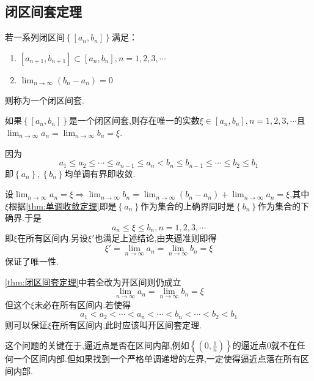 \subsection{闭区间套定理}
\begin{formal}
    \begin{definition}[闭区间套的定义]\label{def:闭区间套的定义}
        若一系列闭区间$\displaystyle\left\{\left[a_n,b_n\right]\right\}$满足：\begin{enumerate}[label={\textup{(\arabic*)}}]
            \item $\displaystyle\left[a_{n+1},b_{n+1}\right]\subset\left[a_n,b_n\right],n=1,2,3,\cdots$
            \item $\displaystyle\lim_{n\to\infty}\left(b_n-a_n\right)=0$
        \end{enumerate}则称为一个闭区间套.
    \end{definition}
\end{formal}
\begin{formal}
    \begin{theorem}[闭区间套定理]\label{thm:闭区间套定理}
        如果$\displaystyle\left\{\left[a_n,b_n\right]\right\}$是一个闭区间套,则存在唯一的实数$\xi\in\left[a_n,b_n\right],n=1,2,3,\cdots$且$\displaystyle\lim_{n\to\infty}a_n=\lim_{n\to\infty}b_n=\xi$.
    \end{theorem}
    \begin{Proof}
        因为\[
        a_1\leqslant a_2\leqslant\cdots\leqslant a_{n-1}\leqslant a_n<b_n\leqslant b_{n-1}\leqslant\cdots\leqslant b_2\leqslant b_1
        \]即$\left\{a_n\right\},\left\{b_n\right\}$均单调有界即收敛.

        设$\displaystyle\lim_{n\to\infty}a_n=\xi\Longrightarrow\lim_{n\to\infty}b_n=\lim_{n\to\infty}\left(b_n-a_n\right)+\lim_{n\to\infty}a_n=\xi$,其中$\xi$根据\cref{thm:单调收敛定理}即是$\left\{a_n\right\}$作为集合的上确界同时是$\left\{b_n\right\}$作为集合的下确界.于是\[
        a_n\leqslant \xi\leqslant b_n,n=1,2,3,\cdots
        \]即$\xi$在所有区间内.另设$\xi'$也满足上述结论,由夹逼准则即得\[\xi'=
        \lim_{n\to\infty}a_n=\lim_{n\to\infty}b_n=\xi
        \]保证了唯一性.
    \end{Proof}
\end{formal}
\begin{red}
    \begin{remark}
        \cref{thm:闭区间套定理}中若全改为开区间则仍成立\[
        \lim_{n\to\infty}a_n=\lim_{n\to\infty}b_n=\xi
        \]但这个$\xi$未必在所有区间内.若使得\[
        a_1<a_2<\cdots<a_n<\cdots<b_n<\cdots<b_2<b_1
        \]则可以保证$\xi$在所有区间内,此时应该叫开区间套定理.

        这个问题的关键在于,逼近点是否在区间内部,例如$\displaystyle\left\{\left(0,\frac{1}{n}\right)\right\}$的逼近点$0$就不在任何一个区间内部.但如果找到一个严格单调递增的左界,一定使得逼近点落在所有区间内部.
    \end{remark}
\end{red}
